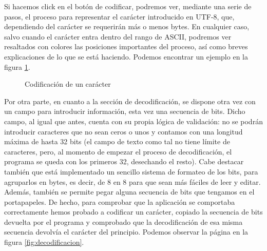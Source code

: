 \documentclass{article}
\begin{document}
Si hacemos click en el botón de codificar, podremos ver, mediante una serie de
pasos, el proceso para representar el carácter introducido en UTF-8, que,
dependiendo del carácter se requerirán más o menos bytes. En cualquier caso,
salvo cuando el carácter entra dentro del rango de ASCII, podremos ver
resaltados con colores las posiciones importantes del proceso, así como breves
explicaciones de lo que se está haciendo. Podemos encontrar un ejemplo en la
figura \ref{fig:codificacion-ejemplo}.

\begin{figure}[h!]
  \centering
  \caption{Codificación de un carácter}
  \label{fig:codificacion-ejemplo}
\end{figure}

\newpage
Por otra parte, en cuanto a la sección de decodificación, se dispone otra vez
con un campo para introducir información, esta vez una secuencia de bits. Dicho
campo, al igual que antes, cuenta con su propia lógica de validación: no se
podrán introducir caracteres que no sean ceros o unos y contamos con una
longitud máxima de hasta 32 bits (el campo de texto como tal no tiene límite de
caracteres, pero, al momento de empezar el proceso de decodificación, el programa
se queda con los primeros 32, desechando el resto). Cabe destacar también que
está implementado un sencillo sistema de formateo de los bits, para agruparlos
en bytes, es decir, de 8 en 8 para que sean más fáciles de leer y editar.
Además, también se permite pegar alguna secuencia de bits que tengamos en el
portapapeles. De hecho, para comprobar que la aplicación se comportaba
correctamente hemos probado a codificar un carácter, copiado la secuencia de
bits devuelta por el programa y comprobado que la decodificación de esa misma
secuencia devolvía el carácter del principio. Podemos observar la página en la
figura \ref{fig:decodificacion}.
\end{document}
